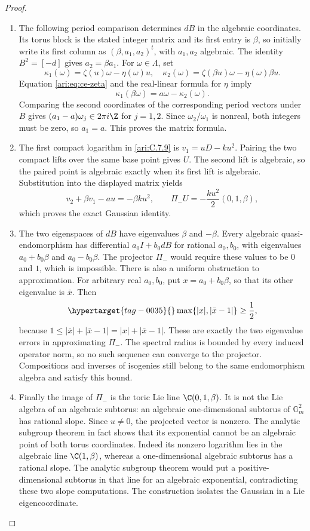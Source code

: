 \begin{proof}
\begin{enumerate}[label=\arabic*.,leftmargin=*]
\item The following period comparison determines $dB$ in the algebraic coordinates. Its torus
block is the stated integer matrix and its first entry is
$\beta$, so initially write its first column as
$(\beta,a_1,a_2)^t$, with $a_1,a_2$ algebraic.
The identity $B^2=[-d]$ gives $a_2=\beta a_1$.
For $\omega\in\Lambda$, set
\[
 \kappa_1(\omega)=\zeta(u)\omega-\eta(\omega)u,
 \quad
 \kappa_2(\omega)=\zeta(\beta u)\omega-\eta(\omega)\beta u.
\]
Equation \eqref{ari:eq:ce-zeta} and the real-linear formula for
$\eta$ imply
\[
 \kappa_1(\beta\omega)=a\omega-\kappa_2(\omega).
\]
Comparing the second coordinates of the corresponding period
vectors under $B$ gives
$(a_1-a)\omega_j\in2\pi i\Z$ for $j=1,2$.
Since $\omega_2/\omega_1$ is nonreal, both integers must
be zero, so $a_1=a$. This proves the matrix formula.

\item The first compact logarithm in \ref{ari:C.7.9} is
$v_1=uD-ku^2$. Pairing the two compact lifts over the same base
point gives $U$. The second lift
is algebraic, so the paired point is algebraic exactly when its
first lift is algebraic.
Substitution into the displayed matrix yields
\[
 v_2+\beta v_1-au=-\beta ku^2,
 \qquad
 \Pi_-U=-\frac{ku^2}{2}(0,1,\beta),
\]
which proves the exact Gaussian identity.

\item The two eigenspaces of $dB$ have eigenvalues $\beta$ and
$-\beta$. Every algebraic quasi-endomorphism has differential
$a_0I+b_0dB$ for rational $a_0,b_0$, with eigenvalues
$a_0+b_0\beta$ and $a_0-b_0\beta$. The projector
$\Pi_-$ would require these values to be $0$ and $1$,
which is impossible. There is also a uniform obstruction to
approximation. For arbitrary real $a_0,b_0$, put
$x=a_0+b_0\beta$, so that its other eigenvalue is
$\bar x$. Then
\begin{equation}\hypertarget{tag-0035}{}\label{ari:eq:ce-gap}
 \max\{|x|,|\bar x-1|\}\ge\frac12,
\end{equation}
because $1\le|\bar x|+|\bar x-1|=|x|+|\bar x-1|$.
These are exactly the two eigenvalue errors in approximating
$\Pi_-$. The spectral radius is bounded by every induced
operator norm, so no such sequence can converge to the
projector. Compositions and inverses of isogenies still belong
to the same endomorphism algebra and satisfy this bound.

\item Finally the image of $\Pi_-$ is the toric Lie line
$\C(0,1,\beta)$. It is not the Lie algebra of an algebraic
subtorus: an algebraic one-dimensional subtorus of
$\mathbb G_m^2$ has rational slope. Since $u\ne0$,
the projected vector is nonzero. The analytic subgroup
theorem in fact shows that its exponential cannot be an
algebraic point of both torus coordinates. Indeed its nonzero logarithm lies in the algebraic line
$\C(1,\beta)$, whereas a one-dimensional algebraic subtorus
has a rational slope. The analytic subgroup theorem would put
a positive-dimensional subtorus in that line for an algebraic
exponential, contradicting these two slope computations. The construction isolates the Gaussian in
a Lie eigencoordinate.


\end{enumerate}
\end{proof}
